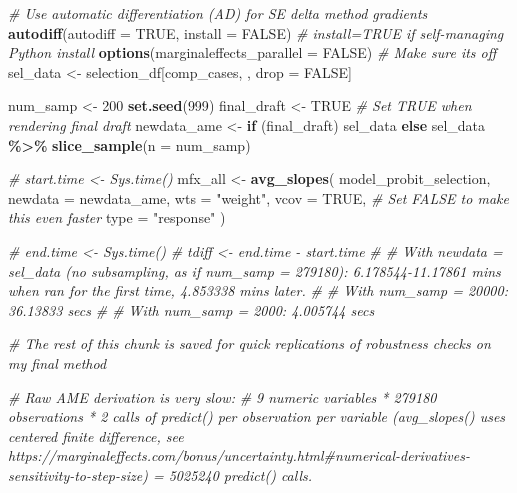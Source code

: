 \documentclass[
]{article}
\newenvironment{Shaded}{\begin{snugshade}}{\end{snugshade}}
\newcommand{\AttributeTok}[1]{\textcolor[rgb]{0.13,0.29,0.53}{#1}}
\newcommand{\CommentTok}[1]{\textcolor[rgb]{0.56,0.35,0.01}{\textit{#1}}}
\newcommand{\ConstantTok}[1]{\textcolor[rgb]{0.56,0.35,0.01}{#1}}
\newcommand{\ControlFlowTok}[1]{\textcolor[rgb]{0.13,0.29,0.53}{\textbf{#1}}}
\newcommand{\DecValTok}[1]{\textcolor[rgb]{0.00,0.00,0.81}{#1}}
\newcommand{\FunctionTok}[1]{\textcolor[rgb]{0.13,0.29,0.53}{\textbf{#1}}}
\newcommand{\NormalTok}[1]{#1}
\newcommand{\OtherTok}[1]{\textcolor[rgb]{0.56,0.35,0.01}{#1}}
\newcommand{\SpecialCharTok}[1]{\textcolor[rgb]{0.81,0.36,0.00}{\textbf{#1}}}
\newcommand{\StringTok}[1]{\textcolor[rgb]{0.31,0.60,0.02}{#1}}
\begin{document}
\begin{Shaded}
\begin{Highlighting}[]
\CommentTok{\# Use automatic differentiation (AD) for SE delta method gradients}
\FunctionTok{autodiff}\NormalTok{(}\AttributeTok{autodiff =} \ConstantTok{TRUE}\NormalTok{, }\AttributeTok{install =} \ConstantTok{FALSE}\NormalTok{) }\CommentTok{\# install=TRUE if self{-}managing Python install}
\FunctionTok{options}\NormalTok{(}\AttributeTok{marginaleffects\_parallel =} \ConstantTok{FALSE}\NormalTok{) }\CommentTok{\# Make sure it\textquotesingle{}s off}
\NormalTok{sel\_data }\OtherTok{\textless{}{-}}\NormalTok{ selection\_df[comp\_cases, , drop }\OtherTok{=} \ConstantTok{FALSE}\NormalTok{]}

\NormalTok{num\_samp }\OtherTok{\textless{}{-}} \DecValTok{200}
\FunctionTok{set.seed}\NormalTok{(}\DecValTok{999}\NormalTok{)}
\NormalTok{final\_draft }\OtherTok{\textless{}{-}} \ConstantTok{TRUE} \CommentTok{\# Set TRUE when rendering final draft}
\NormalTok{newdata\_ame }\OtherTok{\textless{}{-}} \ControlFlowTok{if}\NormalTok{ (final\_draft) sel\_data }\ControlFlowTok{else}\NormalTok{ sel\_data }\SpecialCharTok{\%\textgreater{}\%} \FunctionTok{slice\_sample}\NormalTok{(}\AttributeTok{n =}\NormalTok{ num\_samp)}

\CommentTok{\# start.time \textless{}{-} Sys.time()}
\NormalTok{mfx\_all }\OtherTok{\textless{}{-}} \FunctionTok{avg\_slopes}\NormalTok{(}
\NormalTok{  model\_probit\_selection,}
  \AttributeTok{newdata =}\NormalTok{ newdata\_ame,}
  \AttributeTok{wts =} \StringTok{"weight"}\NormalTok{,}
  \AttributeTok{vcov =} \ConstantTok{TRUE}\NormalTok{, }\CommentTok{\# Set FALSE to make this even faster}
  \AttributeTok{type =} \StringTok{"response"}
\NormalTok{)}

\CommentTok{\# end.time \textless{}{-} Sys.time()}
\CommentTok{\# tdiff \textless{}{-} end.time {-} start.time}
\CommentTok{\# \# With newdata = sel\_data (no subsampling, as if num\_samp = 279180): 6.178544{-}11.17861 mins when ran for the first time, 4.853338 mins later.}
\CommentTok{\# \# With num\_samp = 20000: 36.13833 secs}
\CommentTok{\# \# With num\_samp = 2000: 4.005744 secs}



\CommentTok{\# The rest of this chunk is saved for quick replications of robustness checks on my final method}

\CommentTok{\# Raw AME derivation is very slow: }
\CommentTok{\# 9 numeric variables * 279180 observations * 2 calls of predict() per observation per variable (avg\_slopes() uses centered finite difference, see https://marginaleffects.com/bonus/uncertainty.html\#numerical{-}derivatives{-}sensitivity{-}to{-}step{-}size) = 5025240 predict() calls. }


\end{Highlighting}
\end{Shaded}
\end{document}
